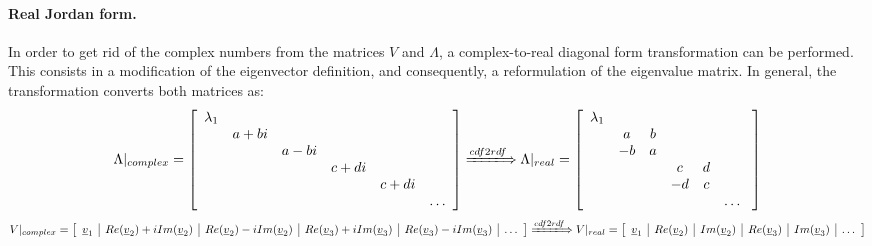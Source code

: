 			\paragraph{ Real Jordan form. \\}
			\indent In order to get rid of the complex numbers from the matrices $V$ and $\Lambda$, a complex-to-real diagonal form transformation can be performed. This consists in a modification of the eigenvector definition, and consequently, a reformulation of the eigenvalue matrix. In general, the transformation converts both matrices as:
			\begin{equation}
			\Lambda\rvert_{complex} = \left[ \begin{array}{cccccc}
			\lambda_1 	& 			& 			& 			& 			& \\
						& a + bi 	& 			& 			& 			& \\
						&			& a - bi 	& 			& 			& \\
						&			&  			& c + di	& 			& \\
						&			&  			& 			& c + di	& \\
						&			&  			& 			&			& \ldots												
			\end{array}\right] \xLongrightarrow{cdf2rdf} \Lambda\rvert_{real} = \left[ \begin{array}{cccccc}
			\lambda_1 	& 			& 			& 			& 			& \\
						& a  		& b			& 			& 			& \\
						& -b		& a 		& 			& 			& \\
						&			&  			& c 		& d			& \\
						&			&  			& -d		& c 		& \\
						&			&  			& 			&			& \ldots\
			\end{array}\right]
			\label{eqCh2:cdf2rdf_lambda}
			\end{equation}
			\begin{equation}
			V\rvert_{complex} = \left[ \begin{array}{c|c|c|c|c|c}
			\underline{v}_1 	& Re(\underline{v}_2) + i Im(\underline{v}_2)	& 	Re(\underline{v}_2) - i Im(\underline{v}_2)	& 	Re(\underline{v}_3) + i Im(\underline{v}_3)	& 	Re(\underline{v}_3)  - i Im(\underline{v}_3)	& \ldots											
			\end{array}\right] \xLongrightarrow{cdf2rdf} V\rvert_{real} = \left[ \begin{array}{c|c|c|c|c|c}
			\underline{v}_1 	& Re(\underline{v}_2) 	& 	Im(\underline{v}_2)	& 	Re(\underline{v}_3)	& Im(\underline{v}_3)	& \ldots
			\end{array}\right]
			\label{eqCh2:cdf2rdf_V}
			\end{equation}

